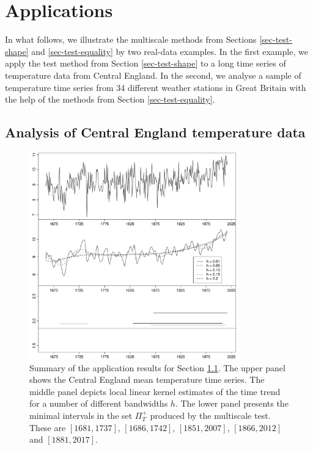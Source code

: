 \documentclass[a4paper,12pt]{article}
\begin{document}
\section{Applications}\label{sec-data}


In what follows, we illustrate the multiscale methods from Sections \ref{sec-test-shape} and \ref{sec-test-equality} by two real-data examples. In the first example, we apply the test method from Section \ref{sec-test-shape} to a long time series of temperature data from Central England. In the second, we analyse a sample of temperature time series from 34 different weather stations in Great Britain with the help of the methods from Section \ref{sec-test-equality}. 


\subsection{Analysis of Central England temperature data}\label{subsec-data-1} 


\begin{figure}[t]
\centering
\includegraphics[width=0.8\textwidth]{Plots/temperature_L1_20_L2_30.pdf}
\caption{Summary of the application results for Section \ref{subsec-data-1}. The upper panel shows the Central England mean temperature time series. The middle panel depicts local linear kernel estimates of the time trend for a number of different bandwidths $h$. The lower panel presents the minimal intervals in the set $\Pi_T^+$ produced by the multiscale test. These are $[1681,1737]$, $[1686,1742]$, $[1851,2007]$, $[1866,2012]$ and $[1881,2017]$.}\label{plot-results-app1}
\end{figure}
\end{document}

